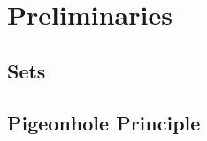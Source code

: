 \section{Preliminaries}
\label{title}

\subsection{Sets}
\label{sets}

\subsection{Pigeonhole Principle}
\label{pigeonhole-principle}
